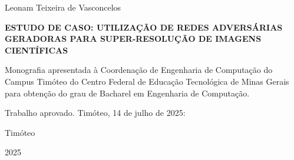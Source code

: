\begin{folhadeaprovacao}

  \begin{center}
    {\ABNTEXchapterfont\large Leonam Teixeira de Vasconcelos}

    \vspace*{\fill}\vspace*{\fill}
    \begin{center}
      \ABNTEXchapterfont\bfseries\Large ESTUDO DE CASO: UTILIZAÇÃO DE REDES ADVERSÁRIAS GERADORAS PARA SUPER-RESOLUÇÃO DE IMAGENS CIENTÍFICAS
    \end{center}
    \vspace*{\fill}
    
    \hspace{.45\textwidth}
    \begin{minipage}{.5\textwidth}
        Monografia apresentada à Coordenação de Engenharia de Computação do Campus Timóteo do Centro Federal de Educação Tecnológica de Minas Gerais para obtenção do grau de Bacharel em Engenharia de Computação.
    \end{minipage}%
    \vspace*{\fill}
   \end{center}
        
   Trabalho aprovado. Timóteo, 14 de julho de 2025:

      
   \begin{center}
    \vspace*{0.5cm}
    {\large Timóteo}
    \par
    {\large 2025}
    \vspace*{1cm}
  \end{center}
  
\end{folhadeaprovacao}